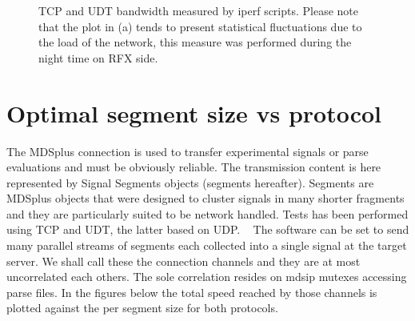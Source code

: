\documentclass[10pt,a4paper]{article}
\begin{document}
\begin{figure}[htbp!]
\centerline{
}
\caption[]
{ TCP and UDT bandwidth measured by iperf scripts. Please note that the plot in (a) tends to present statistical fluctuations due to the load of the network,
this measure was performed during the night time on RFX side. }
\label{fig:iprf}
\end{figure}


\section{ Optimal segment size vs protocol }

The MDSplus connection is used to transfer experimental signals or parse evaluations and must be obviously reliable.
The transmission content is here represented by Signal Segments objects (segments hereafter). 
Segments are MDSplus objects that were designed to cluster signals in many shorter fragments and they are particularly suited to be network handled.
Tests has been performed using TCP and UDT, the latter based on UDP. 
~
The software can be set to send many parallel streams of segments each collected into a single signal at the target server.
We shall call these the connection channels and they are at most uncorrelated each others. The sole correlation resides on mdsip mutexes accessing parse files.
In the figures below the total speed reached by those channels is plotted against the per segment size for both protocols.
\end{document}
